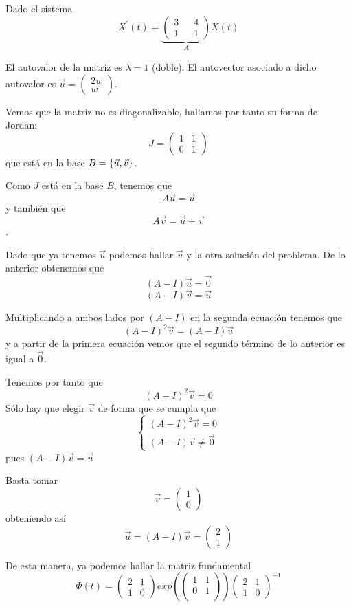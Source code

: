 \documentclass{mathnotes}
\begin{document}
\begin{example}
Dado el sistema $$X^\prime(t) = \underbrace{\begin{pmatrix}
3 & -4\\1 &-1
\end{pmatrix}}_A X(t)$$

El autovalor de la matriz es $\lambda = 1$ (doble). El autovector asociado a dicho autovalor es $\vec{u}=\begin{pmatrix}
2w\\w
\end{pmatrix}$.

Vemos que la matriz no es diagonalizable, hallamos por tanto su forma de Jordan: $$J = \begin{pmatrix}
1 & 1\\0 & 1
\end{pmatrix}$$ que está en la base $B = \{ \vec{u}, \vec{v} \}$.

Como $J$ está en la base $B$, tenemos que $$A\vec{u} = \vec{u}$$
y también que $$A\vec{v}= \vec{u}+\vec{v}$$. 

Dado que ya tenemos $\vec{u}$ podemos hallar $\vec{v}$ y la otra solución del problema. De lo anterior obtenemos que
$$(A-I)\vec{u} = \vec{0}$$
$$(A-I)\vec{v} = \vec{u}$$

Multiplicando a ambos lados por $(A-I)$ en la segunda ecuación tenemos que $$(A-I)^2\vec{v} = (A-I)\vec{u}$$ y a partir de la primera ecuación vemos que el segundo término de lo anterior es igual a $\vec{0}$.

Tenemos por tanto que $$(A-I)^2\vec{v} = 0$$
Sólo hay que elegir $\vec{v}$ de forma que se cumpla que 
\begin{equation*}
  \left\lbrace
  \begin{array}{l}
	(A-I)^2\vec{v} = 0\\
	(A-I)\vec{v} \neq \vec{0}
  \end{array}
  \right.
\end{equation*}
pues $(A-I)\vec{v} = \vec{u}$

Basta tomar $$\vec{v} = \begin{pmatrix}
1 \\ 0
\end{pmatrix}$$
obteniendo así $$\vec{u} = (A-I)\vec{v}  = \begin{pmatrix}
2\\1
\end{pmatrix}$$

De esta manera, ya podemos hallar la matriz fundamental
$$\Phi(t) = \begin{pmatrix}
2 & 1\\1 & 0
\end{pmatrix}exp(\begin{pmatrix}
1 & 1\\0 & 1\\
\end{pmatrix})\begin{pmatrix}
2 & 1\\1 & 0
\end{pmatrix}^{-1}$$


\end{example}
\end{document}
